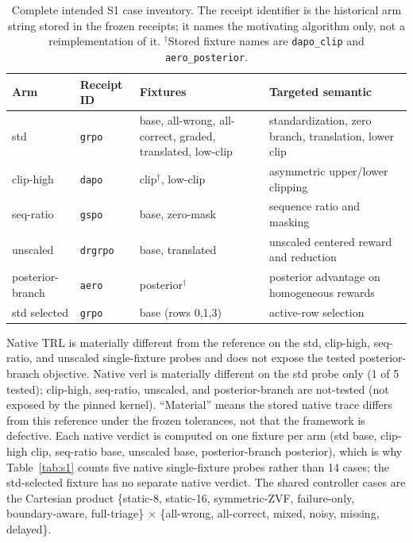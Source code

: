 \documentclass{article}
\begin{document}
\begin{table}[h]
  \centering
  \caption{Complete intended S1 case inventory.  The receipt identifier is the
  historical arm string stored in the frozen receipts; it names the
  motivating algorithm only, not a reimplementation of it.  $^{\dagger}$Stored
  fixture names are \texttt{dapo\_clip} and \texttt{aero\_posterior}.}
  \label{tab:s1-cases}
  \small
  \begin{tabularx}{\linewidth}{llXl}
    \toprule
    Arm & Receipt ID & Fixtures & Targeted semantic \\
    \midrule
    std & \texttt{grpo} & base, all-wrong, all-correct, graded, translated, low-clip
      & standardization, zero branch, translation, lower clip \\
    clip-high & \texttt{dapo} & clip$^{\dagger}$, low-clip & asymmetric upper/lower clipping \\
    seq-ratio & \texttt{gspo} & base, zero-mask & sequence ratio and masking \\
    unscaled & \texttt{drgrpo} & base, translated & unscaled centered reward and reduction \\
    posterior-branch & \texttt{aero} & posterior$^{\dagger}$ & posterior advantage on homogeneous rewards \\
    std selected & \texttt{grpo} & base (rows 0,1,3) & active-row selection \\
    \bottomrule
  \end{tabularx}
\end{table}

Native TRL is materially different from the reference on the std,
clip-high, seq-ratio, and unscaled single-fixture probes and does not expose
the tested posterior-branch objective.  Native verl is materially different
on the std probe only (1 of 5 tested); clip-high, seq-ratio, unscaled, and
posterior-branch are not-tested (not exposed by the pinned kernel).  ``Material'' means the stored native trace differs from
this reference under the frozen tolerances, not that the framework is defective.
Each native verdict is computed on one fixture per arm (std base,
clip-high clip, seq-ratio base, unscaled base, posterior-branch posterior),
which is why Table~\ref{tab:s1} counts five native single-fixture probes
rather than 14 cases; the std-selected fixture has no separate native
verdict.
The shared controller cases are the Cartesian product
\{static-8, static-16, symmetric-ZVF, failure-only, boundary-aware,
full-triage\} $\times$ \{all-wrong, all-correct, mixed, noisy, missing,
delayed\}.
\end{document}
